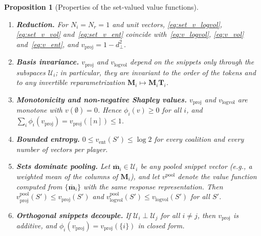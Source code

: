 \documentclass{article}
\newtheorem{proposition}{Proposition}
\begin{document}
\begin{proposition}[Properties of the set-valued value functions]\label{prop:set_values}
\begin{enumerate}
    \item[(i)] \textbf{Reduction.} For $N_i = N_r = 1$ and unit vectors, \eqref{eq:set_v_logvol}, \eqref{eq:set_v_vol} and~\eqref{eq:set_v_ent} coincide with~\eqref{eq:v_logvol}, \eqref{eq:v_vol} and~\eqref{eq:v_ent}, and $v_{\text{proj}} = 1 - d_{\perp}^2$.
    \item[(ii)] \textbf{Basis invariance.} $v_{\text{proj}}$ and $v_{\text{logvol}}$ depend on the snippets only through the subspaces $\mathcal{U}_i$; in particular, they are invariant to the order of the tokens and to any invertible reparametrization $\mathbf{M}_i \mapsto \mathbf{M}_i \mathbf{T}_i$.
    \item[(iii)] \textbf{Monotonicity and non-negative Shapley values.} $v_{\text{proj}}$ and $v_{\text{logvol}}$ are monotone with $v(\emptyset) = 0$. Hence $\phi_i(v) \ge 0$ for all $i$, and $\sum_i \phi_i(v_{\text{proj}}) = v_{\text{proj}}([n]) \le 1$.
    \item[(iv)] \textbf{Bounded entropy.} $0 \le v_{\text{ent}}(S') \le \log 2$ for every coalition and every number of vectors per player.
    \item[(v)] \textbf{Sets dominate pooling.} Let $\bar{\mathbf{m}}_i \in \mathcal{U}_i$ be any pooled snippet vector (e.g., a weighted mean of the columns of $\mathbf{M}_i$), and let $v^{\text{pool}}$ denote the value function computed from $\{\bar{\mathbf{m}}_i\}$ with the same response representation. Then $v^{\text{pool}}_{\text{proj}}(S') \le v_{\text{proj}}(S')$ and $v^{\text{pool}}_{\text{logvol}}(S') \le v_{\text{logvol}}(S')$ for all $S'$.
    \item[(vi)] \textbf{Orthogonal snippets decouple.} If $\mathcal{U}_i \perp \mathcal{U}_j$ for all $i \neq j$, then $v_{\text{proj}}$ is additive, and $\phi_i(v_{\text{proj}}) = v_{\text{proj}}(\{i\})$ in closed form.
\end{enumerate}
\end{proposition}
\end{document}
